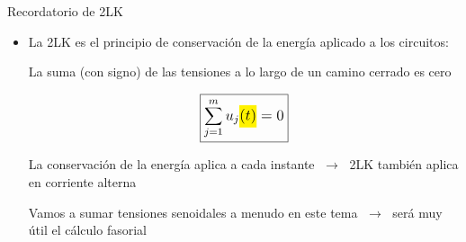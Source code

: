 \documentclass[aspectratio=169, usenames,svgnames,dvipsnames]{beamer}
\begin{document}

\begin{frame}{Recordatorio de 2LK}
    \begin{itemize}
        \item La \alert{2LK} es el principio de \alert{conservación de la energía} aplicado a los circuitos:
        
        \vspace{5mm}
        
        La suma (con signo) de las tensiones a lo largo de un camino cerrado es cero        

        \vspace{2mm}
        \begin{equation*}
            \large{\boxed{\sum_{j=1}^m u_j\colorbox{yellow}{\hspace{-1mm}$(t)$\hspace{-1mm}} = 0}}
        \end{equation*}

        \vspace{2mm}
        La conservación de la energía \alert{aplica a cada instante} $\; \rightarrow \;$ 2LK también \alert{aplica en corriente alterna}

        \vspace{5mm}
        Vamos a sumar tensiones senoidales a menudo en este tema $\; \rightarrow \;$ será muy útil el \alert{cálculo fasorial}
    \end{itemize}    
\end{frame}

\end{document}
